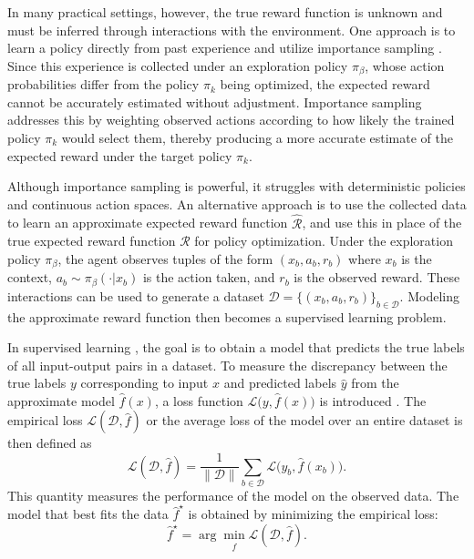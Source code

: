 \documentclass[./dissertation.tex]{subfiles}
\begin{document}
In many practical settings, however, the true reward function is unknown and must be inferred through interactions with the environment. One approach is to learn a policy directly from past experience and utilize importance sampling \parencite{IS}. Since this experience is collected under an exploration policy $\pi_\beta$, whose action probabilities differ from the policy $\pi_k$ being optimized, the expected reward cannot be accurately estimated without adjustment. Importance sampling addresses this by weighting observed actions according to how likely the trained policy $\pi_k$ would select them, thereby producing a more accurate estimate of the expected reward under the target policy $\pi_k$.

Although importance sampling is powerful, it struggles with deterministic policies and continuous action spaces. An alternative approach is to use the collected data to learn an approximate expected reward function $\hat{\mathcal{R}}$, and use this in place of the true expected reward function $\mathcal{R}$ for policy optimization. Under the exploration policy $\pi_\beta$, the agent observes tuples of the form $(x_b, a_b, r_b)$ where $x_b$ is the context, $a_b\sim\pi_\beta(\cdot|x_b)$ is the action taken, and $r_b$ is the observed reward. These interactions can be used to generate a dataset $\mathcal{D}=\{(x_b,a_b,r_b)\}_{b \in \mathcal{D}}$. Modeling the approximate reward function then becomes a supervised learning problem.

In supervised learning \parencite{SL}, the goal is to obtain a model that predicts the true labels of all input-output pairs in a dataset. To measure the discrepancy between the true labels $y$ corresponding to input $x$ and predicted labels $\hat y$ from the approximate model $\hat{f}(x)$, a loss function $\mathcal{L}\big(y,\hat{f}(x)\big)$ is introduced \parencite{LossSurvey}. The empirical loss $\mathscr{L}(\mathcal{D},\hat{f})$ or the average loss of the model over an entire dataset is then defined as 
\begin{equation}
\mathscr{L}(\mathcal{D},\hat{f})=
\frac{1}{\|\mathcal{D}\|} \sum_{b \in \mathcal{D}}
\mathcal{L}\big(y_b,\hat{f}(x_b)\big).
\end{equation}
This quantity measures the performance of the model on the observed data. The model that best fits the data $\hat{f}^{\star}$ is obtained by minimizing the empirical loss:
\begin{equation}
\hat{f}^{\star}= 
\arg\min_{\hat{f}}\mathscr{L}(\mathcal{D},\hat{f}).
\label{SL Problem}
\end{equation}
\end{document}

